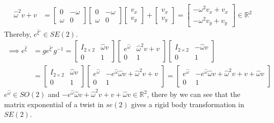 \begin{align*}
    \hat \omega^2 v + v
     & =
    \begin{bmatrix}
        0      & -\omega \\
        \omega & 0
    \end{bmatrix}
    \begin{bmatrix}
        0      & -\omega \\
        \omega & 0
    \end{bmatrix}
    \begin{bmatrix}
        v_x \\
        v_y
    \end{bmatrix}
    +
    \begin{bmatrix}
        v_x \\
        v_y
    \end{bmatrix}
    =
    \begin{bmatrix}
        -\omega^2 v_x + v_x \\
        - \omega^2 v_y + v_y
    \end{bmatrix}
    \in \mathbb{R}^2
\end{align*}
Thereby, \( e^{\hat \xi'} \in SE(2) \).
\begin{align*}
    \implies
    e^{\hat \xi}
     & =
    g e^{\hat \xi'} g^{-1}
    =
    \begin{bmatrix}
        I_{2\times 2} & \hat \omega v \\
        0             & 1
    \end{bmatrix}
    \begin{bmatrix}
        e^{\hat \omega} & \hat \omega^2 v + v \\
        0               & 1
    \end{bmatrix}
    \begin{bmatrix}
        I_{2\times 2} & -\hat \omega v \\
        0             & 1
    \end{bmatrix}
    \\ & =
    \begin{bmatrix}
        I_{2\times 2} & \hat \omega v \\
        0             & 1
    \end{bmatrix}
    \begin{bmatrix}
        e^{\hat \omega} & - e^{\hat\omega} \hat \omega v + \hat \omega^2 v + v \\
        0               & 1
    \end{bmatrix}
    =
    \begin{bmatrix}
        e^{\hat \omega} & - e^{\hat\omega} \hat \omega v + \hat \omega^2 v + v + \hat \omega v \\
        0               & 1
    \end{bmatrix}
\end{align*}
\( e^{\hat \omega} \in SO(2) \) and \( - e^{\hat\omega} \hat \omega v + \hat \omega^2 v + v + \hat \omega v \in \mathbb{R}^2 \), there by we can see that the matrix exponential of a twist in \( se(2) \) gives a rigid body transformation in \( SE(2) \).

